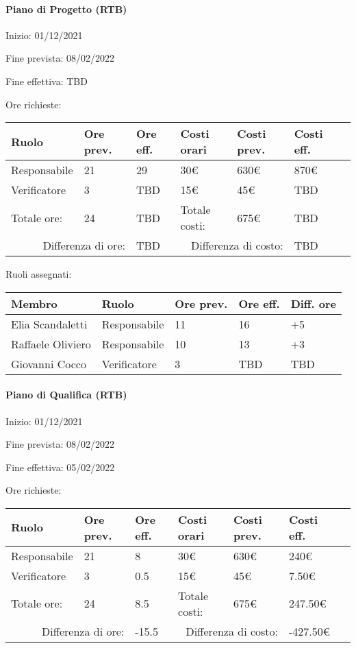 \documentclass[a4paper, 12pt]{article}
\begin{document}
\paragraph{Piano di Progetto (RTB)}
Inizio: 01/12/2021\par
Fine prevista: 08/02/2022\par
Fine effettiva: TBD

Ore richieste:\\[0.5em]
\begin{tabular}{|l|l|l||l|l|l|l|}\hline
Ruolo & Ore prev. & Ore eff. & Costi orari & Costi prev. & Costi eff.\\\hline
Responsabile & 21 & 29 & 30\euro & 630\euro & 870\euro \\\hline
Verificatore & 3 & TBD & 15\euro & 45\euro & TBD \\\hline
Totale ore: & 24 & TBD & Totale costi: & 675\euro & TBD \\\hline
\multicolumn{2}{|r|}{Differenza di ore:} & TBD & \multicolumn{2}{r|}{Differenza di costo:} & TBD \\\hline
\end{tabular}

Ruoli assegnati:\\[0.5em]
\begin{tabular}{|l|l|l|l|l|}\hline
Membro & Ruolo & Ore prev. & Ore eff. & Diff. ore \\\hline
Elia Scandaletti & Responsabile & 11 & 16 & +5 \\\hline
Raffaele Oliviero & Responsabile & 10 & 13 & +3 \\\hline
Giovanni Cocco & Verificatore & 3 & TBD & TBD \\\hline
\end{tabular}

\paragraph{Piano di Qualifica (RTB)}
Inizio: 01/12/2021\par
Fine prevista: 08/02/2022\par
Fine effettiva: 05/02/2022

Ore richieste:\\[0.5em]
\begin{tabular}{|l|l|l||l|l|l|l|}\hline
Ruolo & Ore prev. & Ore eff. & Costi orari & Costi prev. & Costi eff.\\\hline
Responsabile & 21 & 8 & 30\euro & 630\euro & 240\euro \\\hline
Verificatore & 3 & 0.5 & 15\euro & 45\euro & 7.50\euro \\\hline
Totale ore: & 24 & 8.5 & Totale costi: & 675\euro & 247.50\euro \\\hline
\multicolumn{2}{|r|}{Differenza di ore:} & -15.5 & \multicolumn{2}{r|}{Differenza di costo:} & -427.50\euro \\\hline
\end{tabular}
\end{document}
